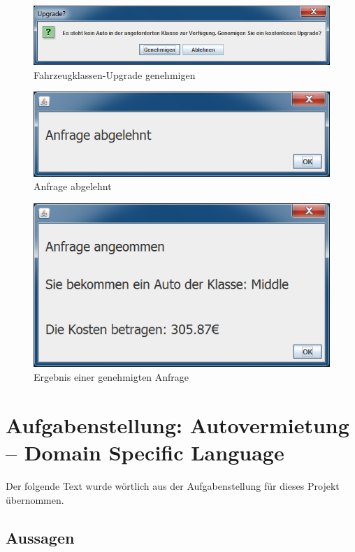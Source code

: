 \begin{figure}
	\centering
	\includegraphics[width=1.0\linewidth]{Bilder/Screenshots/Upgrade}
	\caption{Fahrzeugklassen-Upgrade genehmigen}
	\label{fig:Upgrade}
\end{figure}

\begin{figure}
	\centering
	\includegraphics[width=0.7\linewidth]{Bilder/Screenshots/ergebnis-abgelehnt}
	\caption{Anfrage abgelehnt}
	\label{fig:ergebnisabgelehnt}
\end{figure}

\begin{figure}
	\centering
	\includegraphics[width=0.7\linewidth]{Bilder/Screenshots/ergebnis}
	\caption{Ergebnis einer genehmigten Anfrage}
	\label{fig:ergebnis}
\end{figure}

\newpage
\section{Aufgabenstellung: Autovermietung – Domain Specific Language}
\label{anh:Aufgabe}

Der folgende Text wurde wörtlich aus der Aufgabenstellung für dieses Projekt übernommen.

\subsection*{Aussagen}

